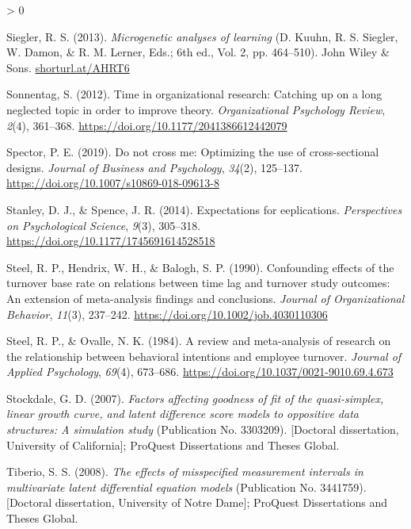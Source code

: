 \documentclass[
12pt, %
twoside,
english]{guelphthesis}
\newlength{\cslhangindent}
\newenvironment{CSLReferences}[2] %
 {%
  \setlength{\parindent}{0pt}
  \ifodd #1 \everypar{\setlength{\hangindent}{\cslhangindent}}\ignorespaces\fi
  \ifnum #2 > 0
  \setlength{\parskip}{\linespacing{2}}
  \fi
 }%
 {}
\theoremstyle{definition}
\theoremstyle{definition}
\theoremstyle{definition}
\theoremstyle{definition}
\theoremstyle{remark}
\begin{document}
\begin{CSLReferences}{1}{0}
\leavevmode{}%
Siegler, R. S. (2013). \emph{Microgenetic analyses of learning} (D. Kuuhn, R. S. Siegler, W. Damon, \& R. M. Lerner, Eds.; 6th ed., Vol. 2, pp. 464--510). John Wiley {\&} Sons. \href{https://shorturl.at/AHRT6}{shorturl.at/AHRT6}

\leavevmode{}%
Sonnentag, S. (2012). Time in organizational research: Catching up on a long neglected topic in order to improve theory. \emph{Organizational Psychology Review}, \emph{2}(4), 361--368. \url{https://doi.org/10.1177/2041386612442079}

\leavevmode{}%
Spector, P. E. (2019). Do not cross me: Optimizing the use of cross-sectional designs. \emph{Journal of Business and Psychology}, \emph{34}(2), 125--137. \url{https://doi.org/10.1007/s10869-018-09613-8}

\leavevmode{}%
Stanley, D. J., \& Spence, J. R. (2014). Expectations for eeplications. \emph{Perspectives on Psychological Science}, \emph{9}(3), 305--318. \url{https://doi.org/10.1177/1745691614528518}

\leavevmode{}%
Steel, R. P., Hendrix, W. H., \& Balogh, S. P. (1990). Confounding effects of the turnover base rate on relations between time lag and turnover study outcomes: An extension of meta-analysis findings and conclusions. \emph{Journal of Organizational Behavior}, \emph{11}(3), 237--242. \url{https://doi.org/10.1002/job.4030110306}

\leavevmode{}%
Steel, R. P., \& Ovalle, N. K. (1984). A review and meta-analysis of research on the relationship between behavioral intentions and employee turnover. \emph{Journal of Applied Psychology}, \emph{69}(4), 673--686. \url{https://doi.org/10.1037/0021-9010.69.4.673}

\leavevmode{}%
Stockdale, G. D. (2007). \emph{Factors affecting goodness of fit of the quasi-simplex, linear growth curve, and latent difference score models to oppositive data structures: A simulation study} (Publication No. 3303209). {[}Doctoral dissertation, University of California{]}; {ProQuest Dissertations and Theses Global.}

\leavevmode{}%
Tiberio, S. S. (2008). \emph{The effects of misspecified measurement intervals in multivariate latent differential equation models} (Publication No. 3441759). {[}Doctoral dissertation, University of Notre Dame{]}; {ProQuest Dissertations and Theses Global.}


\end{CSLReferences}
\end{document}
